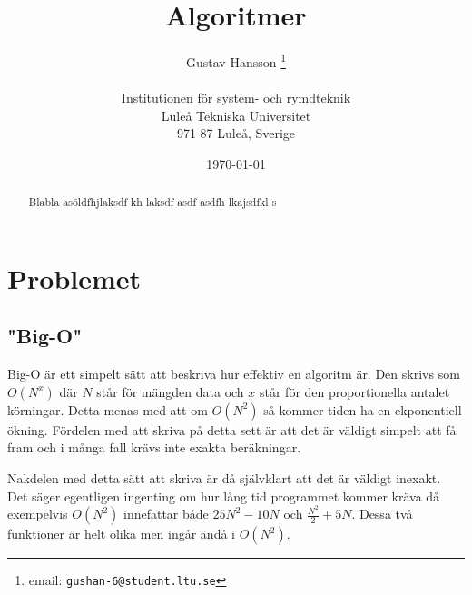 \documentclass[a4paper, 12pt]{article}
\title{Algoritmer} %
\author{Gustav Hansson \thanks{email: \texttt{gushan-6@student.ltu.se}}\\
    ~\\
    Institutionen för system- och rymdteknik \\
    Luleå Tekniska Universitet \\
    971 87 Luleå, Sverige}
\date{\today}
\begin{document}
\maketitle

\begin{abstract}
    Blabla asöldfhjlaksdf kh laksdf asdf asdfh lkajsdfkl s %
\end{abstract}

\section{Problemet}

    \subsection{"Big-O"}
        Big-O är ett simpelt sätt att beskriva hur effektiv en algoritm är.
        Den skrivs som $O(N^x)$ där $N$ står för mängden data och $x$ står för
        den proportionella antalet körningar. Detta menas med att om $O(N^2)$ så
        kommer tiden ha en ekponentiell ökning. Fördelen med att skriva på detta
        sett är att det är väldigt simpelt att få fram och i många fall krävs inte
        exakta beräkningar.

        Nakdelen med detta sätt att skriva är då självklart att det är väldigt inexakt.
        Det säger egentligen ingenting om hur lång tid programmet kommer kräva då
        exempelvis $O(N^2)$ innefattar både $25N^2 - 10N$ och $\frac{N^2}{2} + 5N$.
        Dessa två funktioner är helt olika men ingår ändå i $O(N^2)$.
\end{document}
